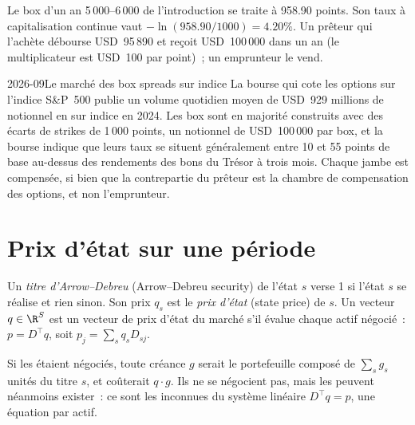 \begin{example}\label{ex:dv:no-arbitrage-and-the-fundamental-theorems:boxrate}
Le box d'un an 5\,000--6\,000 de l'introduction se traite à 958.90 points. Son
taux à capitalisation continue vaut $-\ln(958.90/1000)=4.20\%$. Un prêteur qui l'achète
débourse USD~95\,890 et reçoit USD~100\,000 dans un an (le multiplicateur est
USD~100 par point)~; un emprunteur le vend.
\end{example}

\begin{dated}{2026-09}{Le marché des box spreads sur indice}\label{dat:dv:no-arbitrage-and-the-fundamental-theorems:box}
La bourse qui cote les options sur l'indice S\&P~500 publie un volume quotidien moyen de
USD~929 millions de notionnel en  sur indice en 2024. Les box sont en majorité
construits avec des écarts de strikes de 1\,000 points, un notionnel de USD~100\,000 par box, et la
bourse indique que leurs taux se situent généralement entre 10 et 55 points de base au-dessus
des rendements des bons du Trésor à trois mois. Chaque jambe est compensée, si bien que la
contrepartie du prêteur est la chambre de compensation des options, et non l'emprunteur.
\end{dated}

\section{Prix d'état sur une période}

\begin{definition}\label{def:dv:no-arbitrage-and-the-fundamental-theorems:ad}
Un \emph{titre d'Arrow--Debreu} (Arrow--Debreu security) de l'état $s$
verse 1 si l'état $s$ se réalise et rien sinon. Son prix $q_s$ est le
\emph{prix d'état} (state price) de $s$. Un vecteur $q\in\R^S$ est un
vecteur de prix d'état du marché s'il évalue chaque actif négocié~:
$p = D^\top q$, soit $p_j=\sum_s q_sD_{sj}$.
\end{definition}

Si les  étaient négociés, toute créance $g$ serait le portefeuille
composé de $\sum_s g_s$ unités du titre $s$, et coûterait $q\cdot g$. Ils ne se négocient pas,
mais les  peuvent néanmoins exister~: ce sont les inconnues du système linéaire
$D^\top q=p$, une équation par actif.

